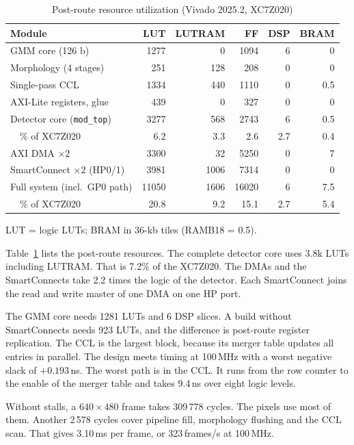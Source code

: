 \documentclass[conference]{IEEEtran}
\begin{document}
\begin{table}[!t]
\caption{Post-route resource utilization (Vivado 2025.2, XC7Z020)}
\label{tab:res}
\centering
\setlength{\tabcolsep}{3.6pt}
\begin{tabular}{@{}lrrrrr@{}}
\toprule
Module & LUT & LUTRAM & FF & DSP & BRAM\\
\midrule
GMM core (126 b)             & 1277 &   0 & 1094 & 6 & 0\\
Morphology (4 stages)        &  251 & 128 &  208 & 0 & 0\\
Single-pass CCL              & 1334 & 440 & 1110 & 0 & 0.5\\
AXI-Lite registers, glue     &  439 &   0 &  327 & 0 & 0\\
\midrule
Detector core (\texttt{mod\_top}) & 3277 & 568 & 2743 & 6 & 0.5\\
\ \ \% of XC7Z020            & 6.2  & 3.3 & 2.6  & 2.7 & 0.4\\
AXI DMA $\times2$            & 3300 &  32 & 5250 & 0 & 7\\
SmartConnect $\times2$ (HP0/1) & 3981 & 1006 & 7314 & 0 & 0\\
Full system (incl.\ GP0 path) & 11050 & 1606 & 16020 & 6 & 7.5\\
\ \ \% of XC7Z020            & 20.8 & 9.2 & 15.1 & 2.7 & 5.4\\
\bottomrule
\end{tabular}

\vspace{1pt}
{\footnotesize LUT = logic LUTs; BRAM in 36-kb tiles (RAMB18 = 0.5).}
\end{table}

Table~\ref{tab:res} lists the post-route resources. The complete detector core
uses 3.8k LUTs including LUTRAM. That is 7.2\% of the XC7Z020. The DMAs and the
SmartConnects take 2.2 times the logic of the detector. Each SmartConnect joins
the read and write master of one DMA on one HP port.

The GMM core needs 1281 LUTs and 6 DSP slices. A build without SmartConnects
needs 923 LUTs, and the difference is post-route register replication. The CCL
is the largest block, because its merger table updates all entries in parallel.
The design meets timing at 100\,MHz with a worst negative slack of
$+0.193$\,ns. The worst path is in the CCL. It runs from the row counter to the
enable of the merger table and takes 9.4\,ns over eight logic levels.

Without stalls, a $640\times480$ frame takes 309\,778 cycles. The pixels use
most of them. Another 2\,578 cycles cover pipeline fill, morphology flushing and
the CCL scan. That gives 3.10\,ms per frame, or 323\,frames/s at 100\,MHz.
\end{document}
